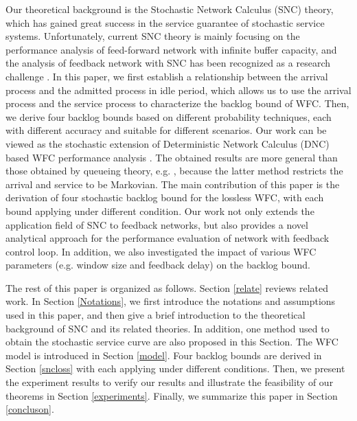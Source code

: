 \documentclass[paper]{ieice}
\begin{document}
Our theoretical background is the Stochastic Network Calculus (SNC) \cite{Chan94,jiang2006basic,Ciucu2006Scaling,5984844,Fidl06} theory, which has gained great success in the service guarantee of stochastic service systems. Unfortunately, current SNC theory is mainly focusing on the performance analysis of feed-forward network with infinite buffer capacity, and the analysis of feedback network with SNC has been recognized as a research challenge \cite{JiangLiu-15877}. In this paper, we first establish a relationship between the arrival process and the admitted process in idle period, which allows us to use the arrival process and the service process to characterize the backlog bound of WFC. Then, we derive four backlog bounds based on different probability techniques, each with different accuracy and suitable for different scenarios. Our work can be viewed as the stochastic extension of Deterministic Network Calculus (DNC) based WFC performance analysis \cite{CrOk96,AgRa96,Chan98,ACOR99,QLDD09FC,bose2006analysis,Qian2010Analysis}. The obtained results are more general than those obtained by queueing theory, e.g. \cite{1095377,jung1996analysis}, because the latter method restricts the arrival and service to be Markovian. The main contribution of this paper is the derivation of four stochastic backlog bound for the lossless WFC, with each bound applying under different condition. Our work not only extends the application field of SNC to feedback networks, but also provides a novel analytical approach for the performance evaluation of network with feedback control loop. In addition, we also investigated the impact of various WFC parameters (e.g. window size and feedback delay) on the backlog bound.

The rest of this paper is organized as follows. Section \ref{relate} reviews related work. In Section \ref{Notations}, we first introduce the notations and assumptions used in this paper, and then give a brief introduction to the theoretical background of SNC and its related theories. In addition, one method used to obtain the stochastic service curve are also proposed in this Section. The WFC model is introduced in Section \ref{model}. Four backlog bounds are derived in Section \ref{sncloss} with each applying under different conditions. Then, we present the experiment results to verify our results and illustrate the feasibility of our theorems in Section \ref{experiments}. Finally, we summarize this paper in Section \ref{concluson}.
\end{document}
